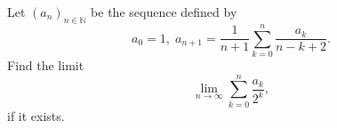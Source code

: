 \documentclass{article}
\begin{document}
\setlength{\parindent}{0pt}
Let $(a_{n})_{n\in\mathbb{N}}$ be the sequence defined by$$a_{0}=1,\;a_{n+1}=\frac{1}{n+1}\sum_{k=0}^{n}\frac{a_{k}}{n-k+2}.$$Find the limit$$\lim_{n\to\infty}\sum_{k=0}^{n}\frac{a_{k}}{2^{k}},$$if it exists.
\end{document}
